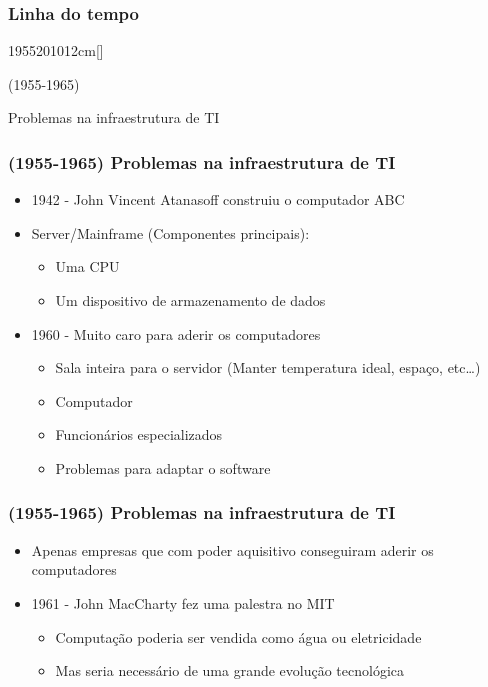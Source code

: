 \begin{frame}
	\frametitle{Linha do tempo}
	\begin{scriptsize}
	\begin{bf}
	\begin{center}
		\begin{chronology}[10]{1955}{2010}{12cm}[\textwidth]
			\color{lightgreen}
		\end{chronology}
	\end{center}
	\end{bf}
	\end{scriptsize}
	\begin{center}
		(1955-1965)

		Problemas na infraestrutura de TI
	\end{center}
\end{frame}

\begin{frame}
	\frametitle{(1955-1965) Problemas na infraestrutura de TI}
	\begin{itemize}
		\item 1942 - John Vincent Atanasoff construiu o computador ABC
		\item Server/Mainframe (Componentes principais):
			\begin{itemize}
				\item Uma CPU
				\item Um dispositivo de armazenamento de dados
			\end{itemize}
		\item 1960 - Muito caro para aderir os computadores
			\begin{itemize}
				\item Sala inteira para o servidor (Manter temperatura ideal, espaço, etc\dots)
				\item Computador
				\item Funcionários especializados
				\item Problemas para adaptar o software
			\end{itemize}
	\end{itemize}
\end{frame}

\begin{frame}
	\frametitle{(1955-1965) Problemas na infraestrutura de TI}
	\begin{itemize}
		\item Apenas empresas que com poder aquisitivo conseguiram aderir os computadores
		\item 1961 - John MacCharty fez uma palestra no MIT
			\begin{itemize}
				\item Computação poderia ser vendida como água ou eletricidade \cite{SimsonTCI}
				\item Mas seria necessário de uma grande evolução tecnológica
			\end{itemize}
	\end{itemize}
\end{frame}


